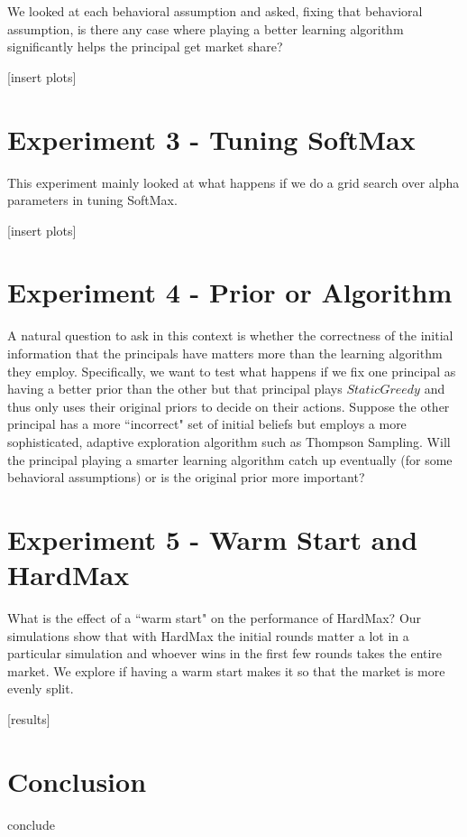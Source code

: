 \documentclass[a4paper]{article}
\begin{document}
We looked at each behavioral assumption and asked, fixing that behavioral assumption, is there any case where playing a better learning algorithm significantly helps the principal get market share?

[insert plots]

\section*{Experiment 3 - Tuning SoftMax}
This experiment mainly looked at what happens if we do a grid search over alpha parameters in tuning SoftMax. 

[insert plots]

\section*{Experiment 4 - Prior or Algorithm}
A natural question to ask in this context is whether the correctness of the initial information that the principals have matters more than the learning algorithm they employ. Specifically, we want to test what happens if we fix one principal as having a better prior than the other but that principal plays $StaticGreedy$ and thus only uses their original priors to decide on their actions.   Suppose the other principal has a more ``incorrect" set of initial beliefs but employs a more sophisticated, adaptive exploration algorithm such as Thompson Sampling. Will the principal playing a smarter learning algorithm catch up eventually (for some behavioral assumptions) or is the original prior more important?

\section*{Experiment 5 - Warm Start and HardMax}
What is the effect of a ``warm start" on the performance of HardMax? Our simulations show that with HardMax the initial rounds matter a lot in a particular simulation and whoever wins in the first few rounds takes the entire market. We explore if having a warm start makes it so that the market is more evenly split.

[results]

\section*{Conclusion}
conclude
\end{document}
